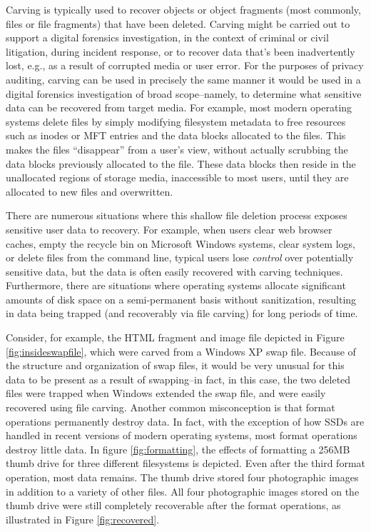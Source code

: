 Carving is typically used to recover objects or object fragments (most
commonly, files or file fragments) that have been deleted.  Carving
might be carried out to support a digital forensics investigation, in
the context of criminal or civil litigation, during incident response,
or to recover data that's been inadvertently lost, e.g., as a result
of corrupted media or user error.  For the purposes of privacy
auditing, carving can be used in precisely the same manner it would be
used in a digital forensics investigation of broad scope--namely, to
determine what sensitive data can be recovered from target media.  For
example, most modern operating systems delete files by simply
modifying filesystem metadata to free resources such as inodes or MFT
entries and the data blocks allocated to the files.  This makes the
files ``disappear'' from a user's view, without actually scrubbing the
data blocks previously allocated to the file.  These data blocks then
reside in the unallocated regions of storage media, inaccessible to
most users, until they are allocated to new files and overwritten.

There are numerous situations where this shallow file deletion process
exposes sensitive user data to recovery.  For example, when users
clear web browser caches, empty the recycle bin on Microsoft Windows
systems, clear system logs, or delete files from the command line,
typical users lose \emph{control} over potentially sensitive data, but
the data is often easily recovered with carving techniques.
Furthermore, there are situations where operating systems allocate
significant amounts of disk space on a semi-permanent basis without
sanitization, resulting in data being trapped (and recoverably via
file carving) for long periods of time.

Consider, for example, the HTML fragment and image file depicted in
Figure \ref{fig:insideswapfile}, which were carved from a Windows XP
swap file.  Because of the structure and organization of swap files,
it would be very unusual for this data to be present as a result of
swapping--in fact, in this case, the two deleted files were trapped
when Windows extended the swap file, and were easily recovered using
file carving.  Another common misconception is that format operations
permanently destroy data.  In fact, with the exception of how SSDs are
handled in recent versions of modern operating systems, most format
operations destroy little data.  In figure \ref{fig:formatting}, the
effects of formatting a 256MB thumb drive for three different
filesystems is depicted.  Even after the third format operation, most
data remains.  The thumb drive stored four photographic images in
addition to a variety of other files.  All four photographic images
stored on the thumb drive were still completely recoverable after the
format operations, as illustrated in Figure \ref{fig:recovered}.

